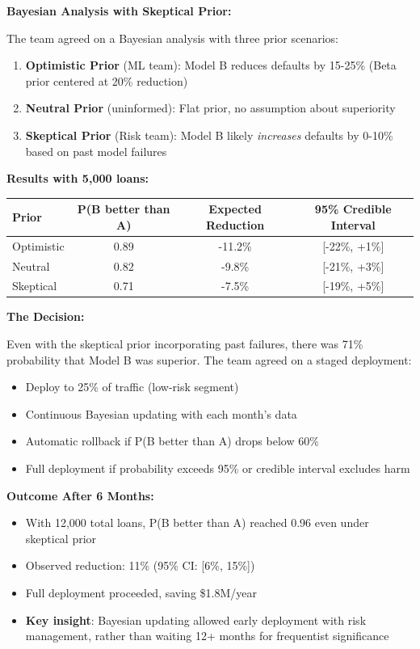 \textbf{Bayesian Analysis with Skeptical Prior:}

The team agreed on a Bayesian analysis with three prior scenarios:
\begin{enumerate}
    \item \textbf{Optimistic Prior} (ML team): Model B reduces defaults by 15-25\% (Beta prior centered at 20\% reduction)
    \item \textbf{Neutral Prior} (uninformed): Flat prior, no assumption about superiority
    \item \textbf{Skeptical Prior} (Risk team): Model B likely \textit{increases} defaults by 0-10\% based on past model failures
\end{enumerate}

\textbf{Results with 5,000 loans:}
\begin{center}
\begin{tabular}{lccc}
\hline
\textbf{Prior} & \textbf{P(B better than A)} & \textbf{Expected Reduction} & \textbf{95\% Credible Interval} \\
\hline
Optimistic & 0.89 & -11.2\% & [-22\%, +1\%] \\
Neutral & 0.82 & -9.8\% & [-21\%, +3\%] \\
Skeptical & 0.71 & -7.5\% & [-19\%, +5\%] \\
\hline
\end{tabular}
\end{center}

\textbf{The Decision:}

Even with the skeptical prior incorporating past failures, there was 71\% probability that Model B was superior. The team agreed on a staged deployment:
\begin{itemize}
    \item Deploy to 25\% of traffic (low-risk segment)
    \item Continuous Bayesian updating with each month's data
    \item Automatic rollback if P(B better than A) drops below 60\%
    \item Full deployment if probability exceeds 95\% or credible interval excludes harm
\end{itemize}

\textbf{Outcome After 6 Months:}
\begin{itemize}
    \item With 12,000 total loans, P(B better than A) reached 0.96 even under skeptical prior
    \item Observed reduction: 11\% (95\% CI: [6\%, 15\%])
    \item Full deployment proceeded, saving \$1.8M/year
    \item \textbf{Key insight}: Bayesian updating allowed early deployment with risk management, rather than waiting 12+ months for frequentist significance
\end{itemize}

